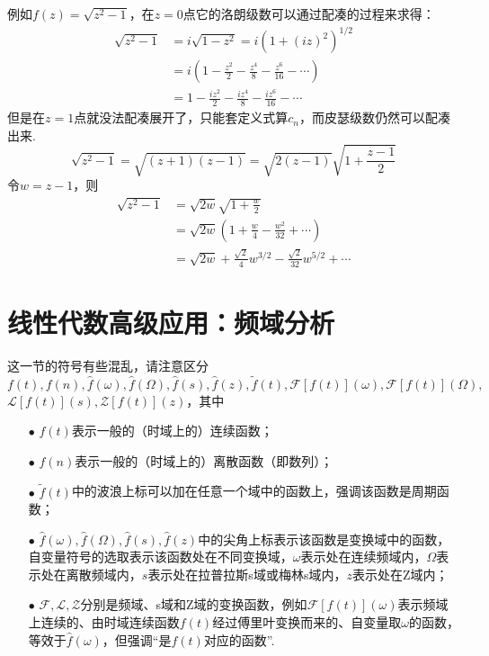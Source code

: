 \documentclass[UTF8]{ctexart}
\begin{document}
例如\(f(z)=\sqrt{z^2-1}\)，在\(z=0\)点它的洛朗级数可以通过配凑的过程来求得：
\begin{align*}
    \sqrt{z^2-1} & =i\sqrt{1-z^2}=i\left(1+(iz)^2\right)^{1/2} \\
    &= i\left(1-\frac{z^2}{2}-\frac{z^4}{8}-\frac{z^6}{16}-\cdots\right)\\ 
    &= 1-\frac{iz^2}{2}-\frac{iz^4}{8}-\frac{iz^6}{16}-\cdots
\end{align*}
但是在\(z=1\)点就没法配凑展开了，只能套定义式算\(c_n\)，而皮瑟级数仍然可以配凑出来.
\[\sqrt{z^2-1}=\sqrt{(z+1)(z-1)}=\sqrt{2(z-1)}\sqrt{1+\frac{z-1}{2}}\]
令\(w=z-1\)，则
\begin{align*}
    \sqrt{z^2-1} &= \sqrt{2w}\sqrt{1+\frac{w}{2}} \\
    & = \sqrt{2w} \left( 1+\frac{w}{4}-\frac{w^2}{32}+\cdots \right)\\
    &= \sqrt{2w}+\frac{\sqrt{2}}{4}w^{3/2}-\frac{\sqrt{2}}{32}w^{5/2}+\cdots
\end{align*}

\section{线性代数高级应用：频域分析}

这一节的符号有些混乱，请注意区分\(f(t), f(n), \hat{f}(\omega), \hat{f}(\Omega), \hat{f}(s), \hat{f}(z), \tilde{f}(t), \mathcal{F}[f(t)](\omega), \mathcal{F}[f(t)](\Omega),\)
\newline
\(\mathcal{L}[f(t)](s), \mathcal{Z}[f(t)](z)\)，其中
\newline
\begin{itemize}
    \item[\(\bullet\)]
     \(f(t)\)表示一般的（时域上的）连续函数；
\end{itemize}
\begin{itemize}
    \item[\(\bullet\)]
    \(f(n)\)表示一般的（时域上的）离散函数（即数列）；
\end{itemize}
\begin{itemize}
    \item[\(\bullet\)]
    \(\tilde{f}(t)\)中的波浪上标可以加在任意一个域中的函数上，强调该函数是周期函数；
\end{itemize}
\begin{itemize}
    \item[\(\bullet\)]
    \(\hat{f}(\omega), \hat{f}(\Omega), \hat{f}(s), \hat{f}(z)\)中的尖角上标\(\hat{}\)表示该函数是变换域中的函数，自变量符号的选取表示该函数处在不同变换域，\(\omega\)表示处在连续频域内，\(\Omega\)表示处在离散频域内，\(s\)表示处在拉普拉斯s域或梅林s域内，\(z\)表示处在Z域内；
\end{itemize}
\begin{itemize}
    \item[\(\bullet\)]
    \(\mathcal{F}, \mathcal{L}, \mathcal{Z}\)分别是频域、s域和Z域的变换函数，例如\(\mathcal{F}[f(t)](\omega)\)表示频域上连续的、由时域连续函数\(f(t)\)经过傅里叶变换而来的、自变量取\(\omega\)的函数，等效于\(\hat{f}(\omega)\)，但强调“是\(f(t)\)对应的函数”.
\end{itemize}
\end{document}
